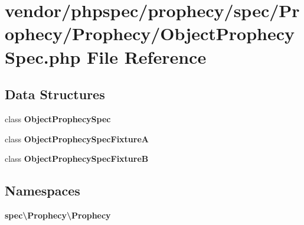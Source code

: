 \section{vendor/phpspec/prophecy/spec/\+Prophecy/\+Prophecy/\+Object\+Prophecy\+Spec.php File Reference}
\label{_object_prophecy_spec_8php}
\subsection*{Data Structures}
\begin{DoxyCompactItemize}
\item 
class {\bf Object\+Prophecy\+Spec}
\item 
class {\bf Object\+Prophecy\+Spec\+Fixture\+A}
\item 
class {\bf Object\+Prophecy\+Spec\+Fixture\+B}
\end{DoxyCompactItemize}
\subsection*{Namespaces}
\begin{DoxyCompactItemize}
\item 
 {\bf spec\textbackslash{}\+Prophecy\textbackslash{}\+Prophecy}
\end{DoxyCompactItemize}
